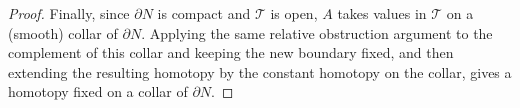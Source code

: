 \documentclass[10pt,a4paper]{amsart}
\newcommand{\cT}{\mathcal{T}}
\begin{document}
\begin{proof}
Finally, since $\partial N$ is compact and $\cT$ is open, $A$ takes values in $\cT$ on a (smooth) collar of $\partial N$. 
Applying the same relative obstruction argument to the complement of this collar and keeping the new boundary fixed, and then extending the resulting homotopy by the constant homotopy on the collar, gives a homotopy fixed on a collar of $\partial N$.
\end{proof}
\end{document}
